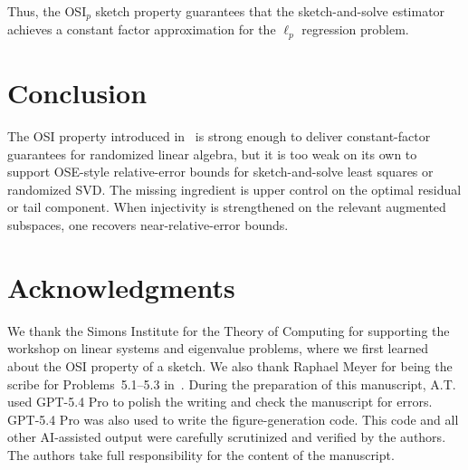 \documentclass[onefignum,onetabnum]{siamart251216}
\begin{document}
Thus,  the OSI${}_p$ sketch property guarantees that the sketch-and-solve estimator achieves a constant factor approximation for the $\ell_p$ regression problem.  

\section{Conclusion}
The OSI property introduced in~\cite{CamanoEtAl2025} is strong enough to deliver constant-factor guarantees for randomized linear algebra, but it is too weak on its own to support OSE-style relative-error bounds for sketch-and-solve least squares or randomized SVD. The missing ingredient is upper control on the optimal residual or tail component. When injectivity is strengthened on the relevant augmented subspaces, one recovers near-relative-error bounds.

\section*{Acknowledgments}
We thank the Simons Institute for the Theory of Computing for supporting the workshop on linear systems and eigenvalue problems, where we first learned about the OSI property of a sketch.  We also thank Raphael Meyer for being the scribe for Problems~5.1--5.3 in~\cite{AmselEtAl2026}. During the preparation of this manuscript, A.T. used GPT-5.4 Pro to polish the writing and check the manuscript for errors. GPT-5.4 Pro was also used to write the figure-generation code. This code and all other AI-assisted output were carefully scrutinized and verified by the authors. The authors take full responsibility for the content of the manuscript.



\end{document}
